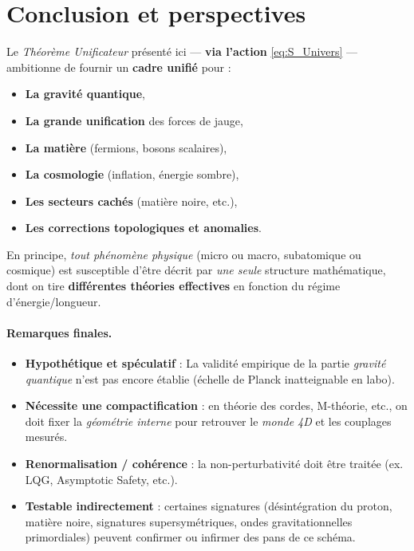 \documentclass[12pt]{article}
\begin{document}
\section{Conclusion et perspectives}
\label{sec:conclusion}

Le \emph{Théorème Unificateur} présenté ici — \textbf{via l'action} \eqref{eq:S_Univers} 
— ambitionne de fournir un \textbf{cadre unifié} pour :

\begin{itemize}
    \item \textbf{La gravité quantique}, 
    \item \textbf{La grande unification} des forces de jauge, 
    \item \textbf{La matière} (fermions, bosons scalaires), 
    \item \textbf{La cosmologie} (inflation, énergie sombre), 
    \item \textbf{Les secteurs cachés} (matière noire, etc.), 
    \item \textbf{Les corrections topologiques et anomalies}.
\end{itemize}

En principe, \emph{tout phénomène physique} (micro ou macro, subatomique ou cosmique) 
est susceptible d'être décrit par \emph{une seule} structure mathématique, 
dont on tire \textbf{différentes théories effectives} en fonction du régime d'énergie/longueur.  

\paragraph{Remarques finales.}
\begin{itemize}
    \item \textbf{Hypothétique et spéculatif} : La validité empirique de la partie \emph{gravité quantique} n'est pas encore établie (échelle de Planck inatteignable en labo).  
    \item \textbf{Nécessite une compactification} : en théorie des cordes, M-théorie, etc., on doit fixer la \emph{géométrie interne} pour retrouver le \emph{monde 4D} et les couplages mesurés.  
    \item \textbf{Renormalisation / cohérence} : la non-perturbativité doit être traitée (ex. LQG, Asymptotic Safety, etc.).  
    \item \textbf{Testable indirectement} : certaines signatures (désintégration du proton, matière noire, signatures supersymétriques, ondes gravitationnelles primordiales) peuvent confirmer ou infirmer des pans de ce schéma.
\end{itemize}
\end{document}
